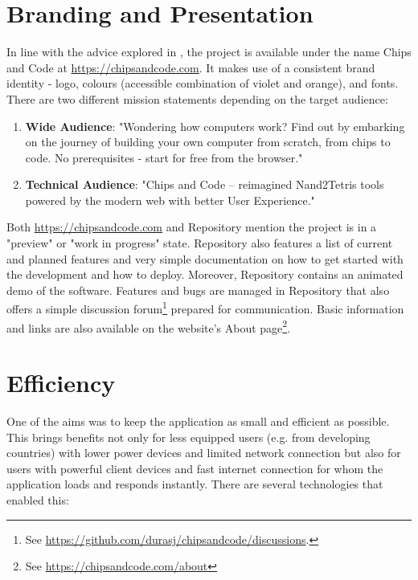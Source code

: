 \section{Branding and Presentation}

In line with the advice explored in , the project is available under the name Chips and Code at \href{chipsandcode.com}{https://chipsandcode.com}.
It makes use of a consistent brand identity - logo, colours (accessible combination of violet and orange), and fonts.
There are two different mission statements depending on the target audience:

\begin{enumerate}
    \item \textbf{Wide Audience}: "Wondering how computers work? Find out by embarking on the journey of building your own computer from scratch, from chips to code. No prerequisites - start for free from the browser."
    \item \textbf{Technical Audience}: "Chips and Code – reimagined Nand2Tetris tools powered by the modern web with better User Experience."
\end{enumerate}

Both \href{chipsandcode.com}{https://chipsandcode.com} and Repository mention the project is in a "preview" or "work in progress" state.
Repository also features a list of current and planned features and very simple documentation on how to get started with the development and how to deploy.
Moreover, Repository contains an animated demo of the software.
Features and bugs are managed in Repository that also offers a simple discussion forum\footnote{See \url{https://github.com/durasj/chipsandcode/discussions}.} prepared for communication.
Basic information and links are also available on the website's About page\footnote{See \url{https://chipsandcode.com/about}}.

\section{Efficiency}

One of the aims was to keep the application as small and efficient as possible.
This brings benefits not only for less equipped users (e.g. from developing countries) with lower power devices and limited network connection but also for users with powerful client devices and fast internet connection for whom the application loads and responds instantly.
There are several technologies that enabled this:

